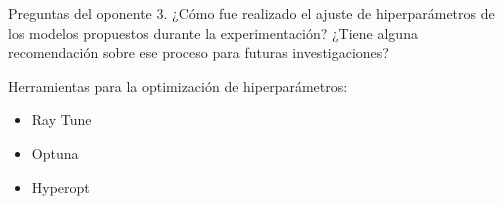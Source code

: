 \documentclass{beamer}
\begin{document}
\begin{frame}[t]{Preguntas del oponente}
    3. ¿Cómo fue realizado el ajuste de hiperparámetros de los modelos propuestos durante la 
    experimentación? ¿Tiene alguna recomendación sobre ese proceso para futuras investigaciones?



    Herramientas para la optimización de hiperparámetros:
    \begin{itemize}
        \pause
        \item Ray Tune
        \pause
        \item Optuna
        \pause
        \item Hyperopt
    \end{itemize}
\end{frame}

\begin{frame}
    \titlepage 
\end{frame}
\logo{}
\end{document}
